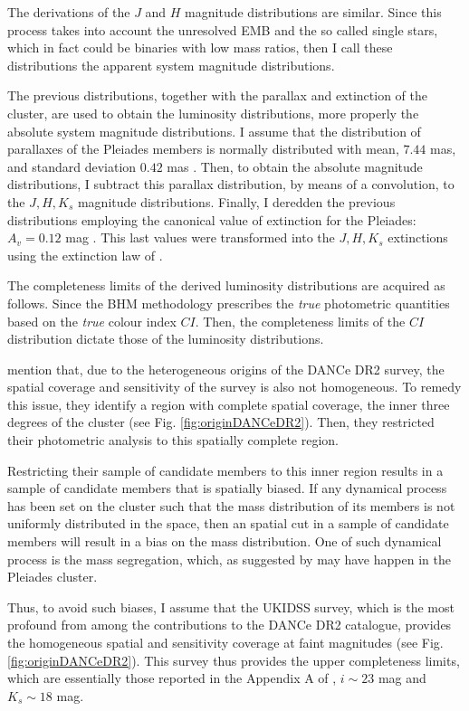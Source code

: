 The derivations of the $J$ and $H$ magnitude distributions are similar. Since this process takes into account the unresolved EMB and the so called single stars, which in fact could be binaries with low mass ratios, then I call these distributions the apparent system magnitude distributions. 

The previous distributions, together with the parallax and extinction of the cluster, are used to obtain the luminosity distributions, more properly the absolute system magnitude distributions. I assume that the distribution of parallaxes of the Pleiades members is normally distributed with mean, $7.44$ mas, and standard deviation $0.42$ mas \citep{Galli2017}. Then, to obtain the absolute magnitude distributions, I subtract this parallax distribution, by means of a convolution, to the $J,H,K_s$ magnitude distributions. Finally, I deredden the previous distributions employing the canonical value of extinction for the Pleiades: $A_v=0.12$ mag \citep{Guthrie1987}. This last values were transformed into the $J,H,K_s$ extinctions using the extinction law of \citet{Cardelli1989}.

The completeness limits of the derived luminosity distributions are acquired as follows. Since the BHM methodology prescribes the \emph{true} photometric quantities based on the \emph{true} colour index $CI$. Then, the completeness limits of the $CI$ distribution dictate those of the luminosity distributions. 

\citet{Bouy2015} mention that, due to the heterogeneous origins of the DANCe DR2 survey, the spatial coverage and sensitivity of the survey is also not homogeneous. To remedy this issue, they identify a region with complete spatial coverage, the inner three degrees of the cluster (see Fig. \ref{fig:originDANCeDR2}). Then, they restricted their photometric analysis to this spatially complete region. 

Restricting their sample of candidate members to this inner region results in a sample of candidate members that is spatially biased. If any dynamical process has been set on the cluster such that the mass distribution of its members is not uniformly distributed in the space, then an spatial cut in a sample of candidate members will result in a bias on the mass distribution. One of such dynamical process is the mass segregation, which, as suggested by \citet{Adams2001} may have happen in the Pleiades cluster. 

Thus, to avoid such biases, I assume that the UKIDSS survey, which is the most profound from among the contributions to the DANCe DR2 catalogue, provides the homogeneous spatial and sensitivity coverage at faint magnitudes (see Fig. \ref{fig:originDANCeDR2}). This survey thus provides the upper completeness limits, which are essentially those reported in the Appendix A of \citet{Bouy2015}, $i\sim23$ mag and $K_s\sim18$ mag.

